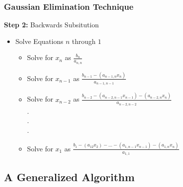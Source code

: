\documentclass[fleqn]{beamer} %
\newcommand{\sectionIVsubsectionIItitle}{Gaussian Elimination Technique}
\newcommand{\sectionIVsubsectionIIItitle}{A Generalized Algorithm}
\begin{document}
			\begin{frame}
				\frametitle{\sectionIVsubsectionIItitle}
				\bigskip

				 {\bf Step 2:} Backwards Subsitution
				\begin{itemize}
					\item Solve Equations $n$ through $1$ \\
						\begin{itemize}
							\item Solve for $x_n$ as $\frac{b_n}{a_{n,n}}$\\
					
							\item Solve for $x_{n-1}$ as $\frac{b_{n-1}-(a_{n-1,n}x_n)}{a_{n-1,n-1}}$ \\
							
							\item Solve for $x_{n-2}$ as $\frac{b_{n-2}-(a_{n-2,n-1}x_{n-1})-(a_{n-2,n}x_{n})}{a_{n-2,n-2}}$\\
							. \\ .\\ . \\					 
							\item Solve for $x_{1}$ as $\frac{b_{1}-(a_{12}x_{2})- . . . -(a_{1,n-1}x_{n-1})-(a_{1,n}x_{n})}{a_{1,1}}$\\	
									
						\end{itemize}
				\end{itemize}

				\btVFill
			\end{frame}	

		\subsection{\sectionIVsubsectionIIItitle}\label{sectionIVsubsectionIII}
\end{document}

